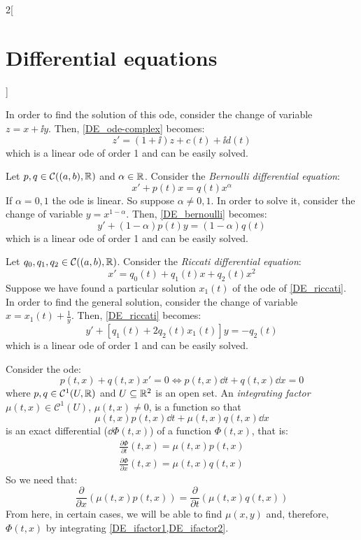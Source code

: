 \documentclass[../../../main.tex]{subfiles}
\begin{document}
\begin{multicols}{2}[\section{Differential equations}]
\begin{method}
        In order to find the solution of this ode, consider the change of variable $z=x+\ii y$. Then, \cref{DE_ode-complex} becomes:
        $$z'=(1+\ii)z+c(t)+\ii d(t)$$ which is a linear ode of order 1 and can be easily solved.
    \end{method}
    \begin{method}
        Let $p,q\in\mathcal{C}((a,b),\mathbb{R})$ and $\alpha\in\mathbb{R}$. Consider the \textit{Bernoulli differential equation}:
        \begin{equation}\label{DE_bernoulli}
            x'+p(t)x=q(t)x^\alpha
        \end{equation}
        If $\alpha=0,1$ the ode is linear. So suppose $\alpha\ne 0,1$. In order to solve it, consider the change of variable $y=x^{1-\alpha}$. Then, \cref{DE_bernoulli} becomes:
        $$y'+(1-\alpha)p(t)y=(1-\alpha)q(t)$$  which is a linear ode of order 1 and can be easily solved.
    \end{method}
    \begin{method}
        Let $q_0,q_1,q_2\in\mathcal{C}((a,b),\mathbb{R})$. Consider the \textit{Riccati differential equation}:
        \begin{equation}\label{DE_riccati}
            x'=q_0(t)+q_1(t)x+q_2(t)x^2
        \end{equation}
        Suppose we have found a particular solution $x_1(t)$ of the ode of \cref{DE_riccati}. In order to find the general solution, consider the change of variable $x=x_1(t)+\frac{1}{y}$. Then, \cref{DE_riccati} becomes:
        $$y'+[q_1(t)+2q_2(t)x_1(t)]y=-q_2(t)$$ which is a linear ode of order 1 and can be easily solved.
    \end{method}
    \begin{method}
        Consider the ode: $$p(t,x)+q(t,x)x'=0\iff p(t,x)\dd t+q(t,x)\dd x=0$$ where $p,q\in\mathcal{C}^1(U,\mathbb{R})$ and $U\subseteq\mathbb{R}^2$ is an open set.
        An \textit{integrating factor} $\mu(t,x)\in\mathcal{C}^1(U)$, $\mu(t,x)\ne 0$, is a function so that $$\mu(t,x)p(t,x)\dd t+\mu(t,x)q(t,x)\dd x$$ is an exact differential ($\dd \Phi(t,x)$) of a function $\Phi(t,x)$, that is:
        \begin{gather}
            \label{DE_ifactor1}\frac{\partial\Phi}{\partial t}(t,x)=\mu(t,x)p(t,x)\\
            \label{DE_ifactor2}\frac{\partial\Phi}{\partial x}(t,x)=\mu(t,x)q(t,x)
        \end{gather}
        So we need that: $$\frac{\partial}{\partial x}\left(\mu(t,x)p(t,x)\right)=\frac{\partial}{\partial t}\left(\mu(t,x)q(t,x)\right)$$
        From here, in certain cases, we will be able to find $\mu(x,y)$ and, therefore, $\Phi(t,x)$ by integrating \cref{DE_ifactor1,DE_ifactor2}.
    \end{method}

\end{multicols}
\end{document}
